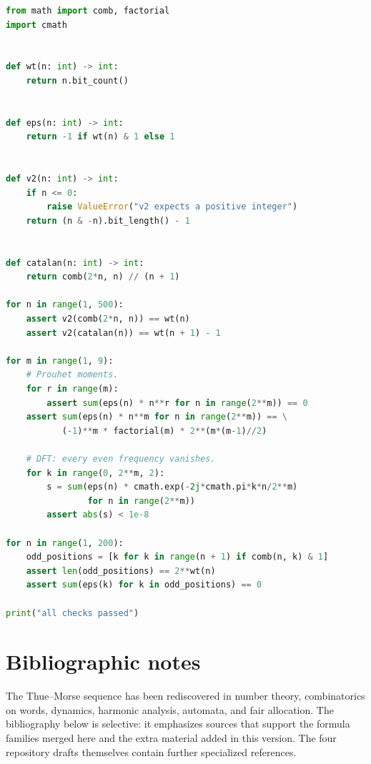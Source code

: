 \documentclass[11pt,oneside]{article}
\numberwithin{equation}{section}
\theoremstyle{definition}
\theoremstyle{remark}
\begin{document}
\begin{lstlisting}[language=Python]
from math import comb, factorial
import cmath


def wt(n: int) -> int:
    return n.bit_count()


def eps(n: int) -> int:
    return -1 if wt(n) & 1 else 1


def v2(n: int) -> int:
    if n <= 0:
        raise ValueError("v2 expects a positive integer")
    return (n & -n).bit_length() - 1


def catalan(n: int) -> int:
    return comb(2*n, n) // (n + 1)

for n in range(1, 500):
    assert v2(comb(2*n, n)) == wt(n)
    assert v2(catalan(n)) == wt(n + 1) - 1

for m in range(1, 9):
    # Prouhet moments.
    for r in range(m):
        assert sum(eps(n) * n**r for n in range(2**m)) == 0
    assert sum(eps(n) * n**m for n in range(2**m)) == \
           (-1)**m * factorial(m) * 2**(m*(m-1)//2)

    # DFT: every even frequency vanishes.
    for k in range(0, 2**m, 2):
        s = sum(eps(n) * cmath.exp(-2j*cmath.pi*k*n/2**m)
                for n in range(2**m))
        assert abs(s) < 1e-8

for n in range(1, 200):
    odd_positions = [k for k in range(n + 1) if comb(n, k) & 1]
    assert len(odd_positions) == 2**wt(n)
    assert sum(eps(k) for k in odd_positions) == 0

print("all checks passed")
\end{lstlisting}

\section{Bibliographic notes}

The Thue--Morse sequence has been rediscovered in number theory,
combinatorics on words, dynamics, harmonic analysis, automata, and fair
allocation.  The bibliography below is selective: it emphasizes sources that
support the formula families merged here and the extra material added in this
version.  The four repository drafts themselves contain further specialized
references.
\end{document}
